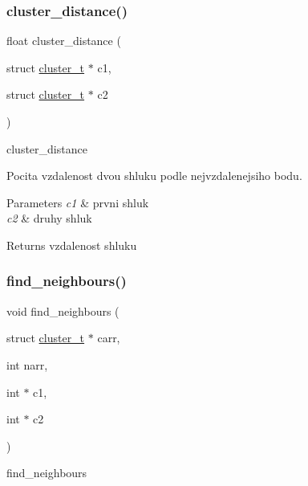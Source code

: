 \subsubsection{\texorpdfstring{cluster\+\_\+distance()}{cluster\_distance()}}
{\footnotesize\ttfamily float cluster\+\_\+distance (\begin{DoxyParamCaption}\item[{struct \hyperlink{structcluster__t}{cluster\+\_\+t} $\ast$}]{c1,  }\item[{struct \hyperlink{structcluster__t}{cluster\+\_\+t} $\ast$}]{c2 }\end{DoxyParamCaption})}



cluster\+\_\+distance 

Pocita vzdalenost dvou shluku podle nejvzdalenejsiho bodu. 
\begin{DoxyParams}{Parameters}
{\em c1} & prvni shluk \\
\hline
{\em c2} & druhy shluk \\
\hline
\end{DoxyParams}
\begin{DoxyReturn}{Returns}
vzdalenost shluku 
\end{DoxyReturn}
\hypertarget{group__Pocitani__s__objekty_ga5f16d682e7c859f7bd3f27697c2b7cc0}{}\label{group__Pocitani__s__objekty_ga5f16d682e7c859f7bd3f27697c2b7cc0} 
\subsubsection{\texorpdfstring{find\+\_\+neighbours()}{find\_neighbours()}}
{\footnotesize\ttfamily void find\+\_\+neighbours (\begin{DoxyParamCaption}\item[{struct \hyperlink{structcluster__t}{cluster\+\_\+t} $\ast$}]{carr,  }\item[{int}]{narr,  }\item[{int $\ast$}]{c1,  }\item[{int $\ast$}]{c2 }\end{DoxyParamCaption})}



find\+\_\+neighbours 

